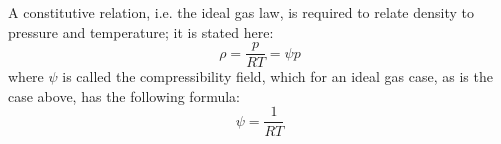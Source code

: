 \documentclass[12pt]{extarticle}
\newcommand{\<}{\langle}
\renewcommand{\>}{\rangle}
\theoremstyle{definition}
\begin{document}
A constitutive relation, i.e. the ideal gas law, is required to relate density to pressure and temperature; it is stated here:
\begin{equation}\label{ideal_gas_law}
\rho=\frac{p}{RT} = \psi p
\end{equation}
where $\psi$ is called the compressibility field, which for an ideal gas case, as is the case above, has the following formula:
\begin{equation}
    \psi = \frac{1}{RT}
\end{equation}
\end{document}
